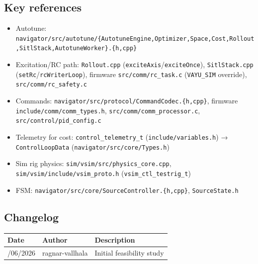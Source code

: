 \documentclass[
  11pt,
]{article}
\providecommand{\tightlist}{%
  \setlength{\itemsep}{0pt}\setlength{\parskip}{0pt}}
\begin{document}
\hypertarget{key-references}{%
\subsection{Key references}\label{key-references}}

\begin{itemize}
\tightlist
\item
  Autotune:
  \texttt{navigator/src/autotune/\{AutotuneEngine,Optimizer,Space,Cost,Rollout,SitlStack,AutotuneWorker\}.\{h,cpp\}}
\item
  Excitation/RC path: \texttt{Rollout.cpp}
  (\texttt{exciteAxis}/\texttt{exciteOnce}), \texttt{SitlStack.cpp}
  (\texttt{setRc}/\texttt{rcWriterLoop}), firmware
  \texttt{src/comm/rc\_task.c} (\texttt{VAYU\_SIM} override),
  \texttt{src/comm/rc\_safety.c}
\item
  Commands: \texttt{navigator/src/protocol/CommandCodec.\{h,cpp\}},
  firmware \texttt{include/comm/comm\_types.h},
  \texttt{src/comm/comm\_processor.c},
  \texttt{src/control/pid\_config.c}
\item
  Telemetry for cost: \texttt{control\_telemetry\_t}
  (\texttt{include/variables.h}) → \texttt{ControlLoopData}
  (\texttt{navigator/src/core/Types.h})
\item
  Sim rig physics: \texttt{sim/vsim/src/physics\_core.cpp},
  \texttt{sim/vsim/include/vsim\_proto.h}
  (\texttt{vsim\_ctl\_testrig\_t})
\item
  FSM: \texttt{navigator/src/core/SourceController.\{h,cpp\}},
  \texttt{SourceState.h}
\end{itemize}

\hypertarget{changelog}{%
\subsection{Changelog}\label{changelog}}

\begin{longtable}[]{@{}lll@{}}
\toprule\noalign{}
Date & Author & Description \\
\midrule\noalign{}
\endhead
\bottomrule\noalign{}
\endlastfoot
15/06/2026 & ragnar-vallhala & Initial feasibility study \\
\end{longtable}
\end{document}
